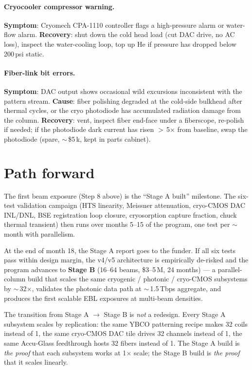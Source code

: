 \documentclass[11pt,letterpaper]{article}
\begin{document}
\paragraph{Cryocooler compressor warning.} \textbf{Symptom}: Cryomech CPA-1110 controller flags a high-pressure alarm or water-flow alarm. \textbf{Recovery}: shut down the cold head load (cut DAC drive, no AC loss), inspect the water-cooling loop, top up He if pressure has dropped below 200\,psi static.

\paragraph{Fiber-link bit errors.} \textbf{Symptom}: DAC output shows occasional wild excursions inconsistent with the pattern stream. \textbf{Cause}: fiber polishing degraded at the cold-side bulkhead after thermal cycles, or the cryo photodiode has accumulated radiation damage from the column. \textbf{Recovery}: vent, inspect fiber end-face under a fiberscope, re-polish if needed; if the photodiode dark current has risen $>$\,5$\times$ from baseline, swap the photodiode (spare, $\sim$\,\$5\,k, kept in parts cabinet).

\section{Path forward}

The first beam exposure (Step 8 above) is the ``Stage A built'' milestone. The six-test validation campaign (HTS linearity, Meissner attenuation, cryo-CMOS DAC INL/DNL, BSE registration loop closure, cryosorption capture fraction, chuck thermal transient) then runs over months 5--15 of the program, one test per $\sim$\,month with parallelism.

At the end of month 18, the Stage A report goes to the funder. If all six tests pass within design margin, the v4/v5 architecture is empirically de-risked and the program advances to \textbf{Stage B} (16--64 beams, \$3--5\,M, 24 months) --- a parallel-column build that scales the same cryogenic / photonic / cryo-CMOS subsystems by $\sim$\,32$\times$, validates the photonic data path at $\sim$\,1.5\,Tbps aggregate, and produces the first scalable EBL exposures at multi-beam densities.

The transition from Stage A $\to$ Stage B is \textit{not} a redesign. Every Stage A subsystem scales by replication: the same YBCO patterning recipe makes 32 coils instead of 1, the same cryo-CMOS DAC tile drives 32 channels instead of 1, the same Accu-Glass feedthrough hosts 32 fibers instead of 1. The Stage A build is \textit{the proof} that each subsystem works at 1$\times$ scale; the Stage B build is \textit{the proof} that it scales linearly.
\end{document}
